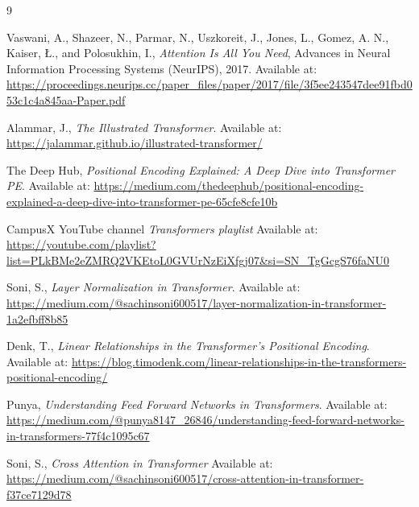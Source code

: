 \begin{thebibliography}{9}

Vaswani, A., Shazeer, N., Parmar, N., Uszkoreit, J., Jones, L.,
Gomez, A. N., Kaiser, \L{}., and Polosukhin, I.,
\textit{Attention Is All You Need},
Advances in Neural Information Processing Systems (NeurIPS), 2017.
Available at:
\url{https://proceedings.neurips.cc/paper_files/paper/2017/file/3f5ee243547dee91fbd053c1c4a845aa-Paper.pdf}

Alammar, J.,
\textit{The Illustrated Transformer}.
Available at:
\url{https://jalammar.github.io/illustrated-transformer/}

The Deep Hub,
\textit{Positional Encoding Explained: A Deep Dive into Transformer PE}.
Available at:
\url{https://medium.com/thedeephub/positional-encoding-explained-a-deep-dive-into-transformer-pe-65cfe8cfe10b}

CampusX YouTube channel
\textit{Transformers playlist}
Available at:
\url{https://youtube.com/playlist?list=PLkBMe2eZMRQ2VKEtoL0GVUrNzEiXfgj07&si=SN_TgGcgS76faNU0}

Soni, S.,
\textit{Layer Normalization in Transformer}.
Available at:
\url{https://medium.com/@sachinsoni600517/layer-normalization-in-transformer-1a2efbff8b85}

Denk, T.,
\textit{Linear Relationships in the Transformer's Positional Encoding}.
Available at:
\url{https://blog.timodenk.com/linear-relationships-in-the-transformers-positional-encoding/}

Punya,
\textit{Understanding Feed Forward Networks in Transformers}.
Available at:
\url{https://medium.com/@punya8147_26846/understanding-feed-forward-networks-in-transformers-77f4c1095c67}

Soni, S.,
\textit{Cross Attention in Transformer}
Available at:
\url{https://medium.com/@sachinsoni600517/cross-attention-in-transformer-f37ce7129d78}

\end{thebibliography}